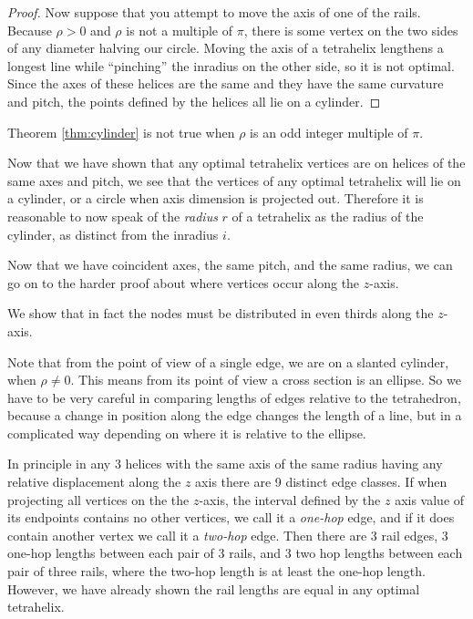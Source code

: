 \documentclass[11pt]{article}
\begin{document}
\begin{proof}
Now suppose that you attempt to move the axis of one of the rails. Because
$\rho > 0 $ and $\rho$ is not a multiple of $\pi$, there is some vertex on the two sides of any diameter
halving our circle. Moving the axis of a tetrahelix lengthens a longest line while ``pinching'' the
inradius on the other side, so it is not optimal. Since the axes of these helices are the
same and they have the same curvature and pitch, the points defined by the helices all lie
on a cylinder.


\end{proof}

Theorem \ref{thm:cylinder} is not true when $\rho$ is an odd integer multiple of $\pi$.

Now that we have shown that any optimal tetrahelix vertices
are on helices of the same axes and pitch, we see that the vertices 
of any optimal tetrahelix will lie on a cylinder, or a circle when axis dimension
is projected out. Therefore it is reasonable to now speak of the \emph{radius} $r$
of a tetrahelix as the radius of the cylinder, as distinct from the inradius $i$.

Now that we have coincident axes, the same pitch, and the same radius, we can go on to
 the harder proof about where vertices occur along the $z$-axis.

 We show that in fact the nodes must be distributed in even thirds
 along the $z$-axis.

 Note that from the point of view of a single edge, we are on a
 slanted cylinder, when $\rho \neq 0$.  This means from its point of
 view a cross section is an ellipse. So we have to be very careful in
 comparing lengths of edges relative to the tetrahedron, because a
 change in position along the edge changes the length of a line, but
 in a complicated way depending on where it is relative to the
 ellipse.

 In principle in any 3 helices with the same axis of the same radius
 having any relative
 displacement along the $z$ axis there are 9 distinct edge classes.
 If when projecting all vertices on the the $z$-axis, the interval
 defined by the $z$ axis value of its endpoints contains no other vertices,
 we call it a \emph{one-hop} edge, and if it does contain another vertex we
 call it a \emph{two-hop} edge.
 Then there are 
 3 rail edges, 3 one-hop lengths between each pair of 3 rails, and 3 two hop
 lengths between each pair of three rails, where the two-hop length is at least
 the one-hop length.
 However, we have already shown the rail
 lengths are equal in any optimal tetrahelix.
\end{document}
